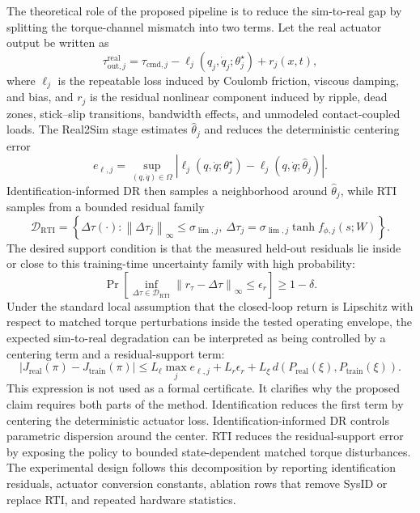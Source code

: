 \documentclass[twoside,final,1p,times]{elsarticle}
\newenvironment{revblock}{}{}
\begin{document}
\begin{revblock}
The theoretical role of the proposed pipeline is to reduce the sim-to-real gap by splitting the torque-channel mismatch into two terms. Let the real actuator output be written as
\begin{equation}
  \tau^{\mathrm{real}}_{\mathrm{out},j}=\tau_{\mathrm{cmd},j}-\ell_j(q_j,\dot q_j;\theta_j^\star)+r_j(x,t),
  \label{eq:real_actuator_split}
\end{equation}
where $\ell_j$ is the repeatable loss induced by Coulomb friction, viscous damping, and bias, and $r_j$ is the residual nonlinear component induced by ripple, dead zones, stick--slip transitions, bandwidth effects, and unmodeled contact-coupled loads. The Real2Sim stage estimates $\hat\theta_j$ and reduces the deterministic centering error
\begin{equation}
  e_{\ell,j}=\sup_{(q,\dot q)\in\Omega}\left|\ell_j(q,\dot q;\theta_j^\star)-\ell_j(q,\dot q;\hat\theta_j)\right|.
  \label{eq:centering_error}
\end{equation}
Identification-informed DR then samples a neighborhood around $\hat\theta_j$, while RTI samples from a bounded residual family
\begin{equation}
  \mathcal{D}_{\mathrm{RTI}}=\left\{\Delta\tau(\cdot):\left\|\Delta\tau_j\right\|_\infty\leq\sigma_{\lim,j},\ \Delta\tau_j=\sigma_{\lim,j}\tanh f_{\phi,j}(s;W)\right\}.
  \label{eq:rti_uncertainty_set}
\end{equation}
The desired support condition is that the measured held-out residuals lie inside or close to this training-time uncertainty family with high probability:
\begin{equation}
  \Pr\left[\inf_{\Delta\tau\in\mathcal{D}_{\mathrm{RTI}}}\left\|r_\tau-\Delta\tau\right\|_\infty\leq \epsilon_r\right]\geq 1-\delta.
  \label{eq:support_condition}
\end{equation}
Under the standard local assumption that the closed-loop return is Lipschitz with respect to matched torque perturbations inside the tested operating envelope, the expected sim-to-real degradation can be interpreted as being controlled by a centering term and a residual-support term:
\begin{equation}
  \left|J_{\mathrm{real}}(\pi)-J_{\mathrm{train}}(\pi)\right|
  \leq L_{\ell}\max_j e_{\ell,j}+L_r\epsilon_r+L_{\xi}\,d\!
  \left(P_{\mathrm{real}}(\xi),P_{\mathrm{train}}(\xi)\right).
  \label{eq:robustness_bound_interpretation}
\end{equation}
This expression is not used as a formal certificate. It clarifies why the proposed claim requires both parts of the method. Identification reduces the first term by centering the deterministic actuator loss. Identification-informed DR controls parametric dispersion around the center. RTI reduces the residual-support error by exposing the policy to bounded state-dependent matched torque disturbances. The experimental design follows this decomposition by reporting identification residuals, actuator conversion constants, ablation rows that remove SysID or replace RTI, and repeated hardware statistics.


\end{revblock}
\end{document}
